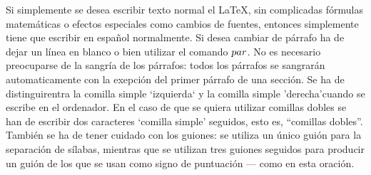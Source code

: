 \documentclass[a4paper,10pt]{letter}
\begin{document}
Si simplemente se desea escribir texto normal el LaTeX,
sin complicadas fórmulas matemáticas o efectos especiales
como cambios de fuentes, entonces simplemente tiene que escribir
en español normalmente.
Si desea cambiar de párrafo ha de dejar un línea en blanco o bien
utilizar el comando $\\par$.
No es necesario preocuparse de la sangría de los párrafos:
todos los párrafos se sangrarán automaticamente con la exepción
del primer párrafo de una sección.
Se ha de distinguirentra la comilla simple `izquierda`
y la comilla simple 'derecha'cuando se escribe en el ordenador.
En el caso de que se quiera utilizar comillas dobles se han de
escribir dos caracteres `comilla simple' seguidos, esto es,
``comillas dobles''.
También se ha de tener cuidado con los guiones: se utiliza un único
guión para la separación de sílabas, mientras que se utilizan
tres guiones seguidos para producir un guión de los que se usan
como signo de puntuación --- como en esta oración.
\end{document}
